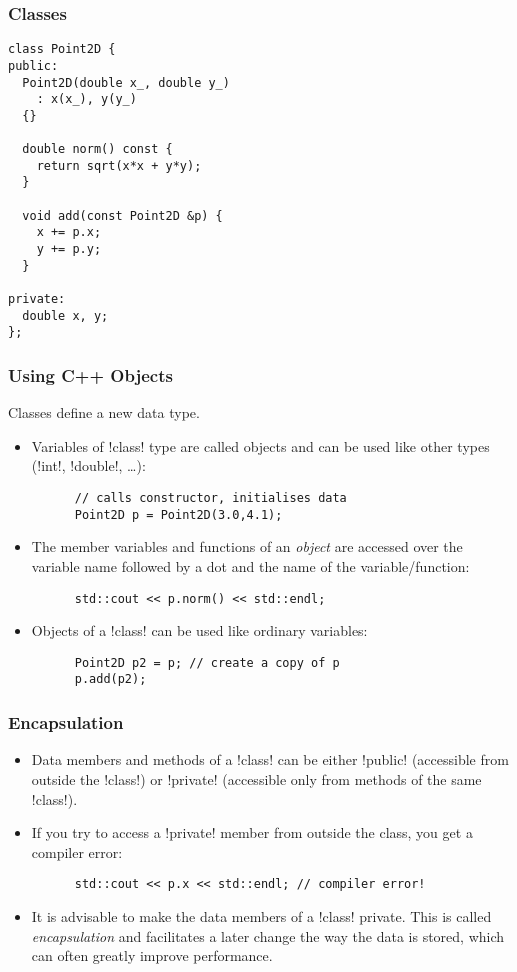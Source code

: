\begin{frame}[fragile]
  \frametitle{Classes}
  \begin{lstlisting}
class Point2D {
public:
  Point2D(double x_, double y_)
    : x(x_), y(y_)
  {}

  double norm() const {
    return sqrt(x*x + y*y);
  }

  void add(const Point2D &p) {
    x += p.x;
    y += p.y;
  }

private:
  double x, y;
};
  \end{lstlisting}
\end{frame}

\begin{frame}[fragile]
  \frametitle{Using C++ Objects}
 Classes define a new data type. 
\begin{itemize}
  \item Variables of \inline!class! type are called objects and can be used like other types (\inline!int!, \inline!double!, \dots):
    \begin{lstlisting}
      // calls constructor, initialises data
      Point2D p = Point2D(3.0,4.1); 
    \end{lstlisting}
  \item The member variables and functions of an \emph{object} are accessed over the variable name followed by a dot and the name of the variable/function:
    \begin{lstlisting}
      std::cout << p.norm() << std::endl;
    \end{lstlisting}
  \item Objects of a \inline!class! can be used like ordinary variables:
    \begin{lstlisting}
      Point2D p2 = p; // create a copy of p
      p.add(p2);
    \end{lstlisting}
  \end{itemize}
\end{frame}

\begin{frame}[fragile]
  \frametitle{Encapsulation}
  \begin{itemize}
  \item Data members and methods of a \inline!class! can be either \inline!public! (accessible from outside the \inline!class!) or \inline!private! (accessible only from methods of the same \inline!class!).
  \item If you try to access a \inline!private! member from outside the class, you get a compiler error:
    \begin{lstlisting}
      std::cout << p.x << std::endl; // compiler error!
    \end{lstlisting}
  \item It is advisable to make the data members of a \inline!class! private. This is called \emph{encapsulation} and facilitates a later change the way the data is stored, which can often greatly improve performance. 
  \end{itemize}
\end{frame}

